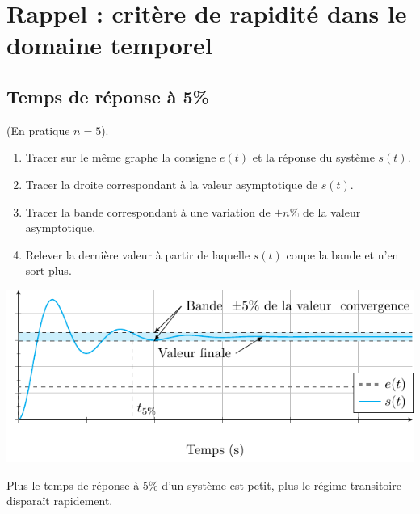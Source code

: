 \documentclass[10pt,fleqn]{article} %
\begin{document}

\setlength{\columnseprule}{.1pt}

\vspace{2cm}
\pagestyle{fancy}
\thispagestyle{plain}

\section{Rappel : critère de rapidité dans le domaine temporel}

\subsection{Temps de réponse à 5\%}

\begin{methode}
 (En pratique $n=5$).\\

\begin{enumerate}
\item Tracer sur le même graphe la consigne $e(t)$ et la réponse du système
$s(t)$.
\item Tracer la droite correspondant à la valeur asymptotique de $s(t)$.
\item Tracer la bande correspondant à une variation de $\pm n\%$ de la valeur
asymptotique.
\item Relever la dernière valeur à partir de laquelle $s(t)$ coupe la bande et
n'en sort plus.
\end{enumerate}
\end{methode}

\begin{center}
%
\includegraphics{images/perf}
\end{center}

\begin{resultat}
Plus le temps de réponse à 5\% d'un système est petit, plus le régime transitoire disparaît rapidement. 
\end{resultat}
\end{document}

